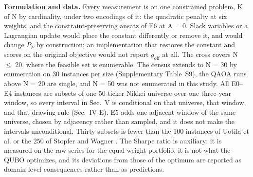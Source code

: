 \documentclass{ieeeaccess}
\begin{document}
\textbf{Formulation and data.} Every measurement is on one constrained problem, K of N by cardinality, under two encodings of it: the quadratic penalty at six weights, and the constraint-preserving ansatz of E6 at A = 0. Slack variables or a Lagrangian update would place the constant differently or remove it, and would change $P_{F}$ by construction; an implementation that restores the constant and scores on the original objective would not report $g_{\mathrm{off}}$ at all. The cross covers N $\leq$ 20, where the feasible set is enumerable. The census extends to N = 30 by enumeration on 30 instances per size (Supplementary Table~S9), the QAOA runs above N = 20 are single, and N = 50 was not enumerated in this study. All E0--E4 instances are subsets of one 50-ticker Nikkei universe over one three-year window, so every interval in Sec.~V is conditional on that universe, that window, and that drawing rule (Sec.~IV-E). E5 adds one adjacent window of the same universe, chosen by adjacency rather than sampled, and it does not make the intervals unconditional. Thirty subsets is fewer than the 100 instances of Uotila et al. \cite{ref18} or the 250 of Stopfer and Wagner \cite{ref13}. The Sharpe ratio is auxiliary: it is measured on the raw series for the equal-weight portfolio, it is not what the QUBO optimizes, and its deviations from those of the optimum are reported as domain-level consequences rather than as predictions.
\end{document}
